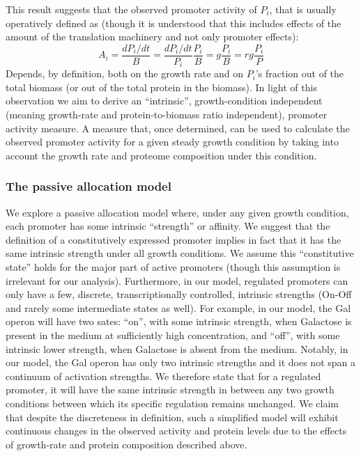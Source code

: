 \documentclass[a4page,notitlepage]{article}
\begin{document}
This result suggests that the observed promoter activity of $P_i$, that is usually operatively defined as (though it is understood that this includes effects of the amount of the translation machinery and not only promoter effects):
\begin{equation}
\label{pa-gr-relation}
A_i=\frac{dP_i/dt}{B}=\frac{dP_i/dt}{P_i}\frac{P_i}{B}=g\frac{P_i}{B}=rg\frac{P_i}{P}
\end{equation}
Depends, by definition, both on the growth rate and on $P_i$'s fraction out of the total biomass (or out of the total protein in the biomass).
In light of this observation we aim to derive an “intrinsic”, growth-condition independent (meaning growth-rate and protein-to-biomass ratio independent), promoter activity measure.
A measure that, once determined, can be used to calculate the observed promoter activity for a given steady growth condition by taking into account the growth rate and proteome composition under this condition.
\subsubsection{The passive allocation model}
We explore a passive allocation model where, under any given growth condition, each promoter has some intrinsic ``strength'' or affinity.
We suggest that the definition of a constitutively expressed promoter implies in fact that it has the same intrinsic strength under all growth conditions.
We assume this ``constitutive state'' holds for the major part of active promoters (though this assumption is irrelevant for our analysis).
Furthermore, in our model, regulated promoters can only have a few, discrete, transcriptionally controlled, intrinsic strengths (On-Off and rarely some intermediate states as well).
For example, in our model, the Gal operon will have two sates: ``on'', with some intrinsic strength, when Galactose is present in the medium at sufficiently high concentration, and ``off'', with some intrinsic lower strength, when Galactose is absent from the medium.
Notably, in our model, the Gal operon has only two intrinsic strengths and it does not span a continuum of activation strengths.
We therefore state that for a regulated promoter, it will have the same intrinsic strength in between any two growth conditions between which its specific regulation remains unchanged.
We claim that despite the discreteness in definition, such a simplified model will exhibit continuous changes in the observed activity and protein levels due to the effects of growth-rate and protein composition described above.
\end{document}
